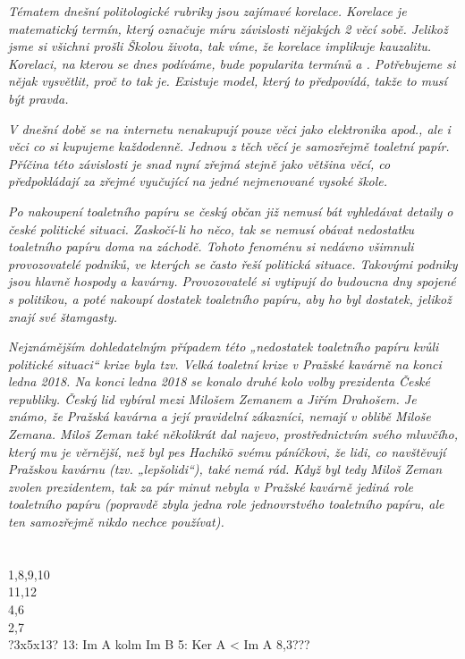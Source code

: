 \documentclass[12pt, a4paper]{article}
\begin{document}
\textit{Tématem dnešní politologické rubriky jsou zajímavé korelace. Korelace je matematický termín, který označuje míru závislosti nějakých 2 věcí sobě. Jelikož jsme si všichni prošli Školou života, tak víme, že korelace implikuje kauzalitu. Korelaci, na kterou se dnes podíváme, bude popularita termínů  a . Potřebujeme si nějak vysvětlit, proč to tak je. Existuje model, který to předpovídá, takže to musí být pravda. }

\textit{V dnešní době se na internetu nenakupují pouze věci jako elektronika apod., ale i věci co si kupujeme každodenně. Jednou z těch věcí je samozřejmě toaletní papír. Příčina této závislosti je snad nyní zřejmá stejně jako většina věcí, co předpokládají za zřejmé vyučující na jedné nejmenované vysoké škole.}

\textit{Po nakoupení toaletního papíru se český občan již nemusí bát vyhledávat detaily o české politické situaci. Zaskočí-li ho něco, tak se nemusí obávat nedostatku toaletního papíru doma na záchodě. Tohoto fenoménu si nedávno všimnuli provozovatelé podniků, ve kterých se často řeší politická situace. Takovými podniky jsou hlavně hospody a kavárny. Provozovatelé si vytipují do budoucna dny spojené s politikou, a poté nakoupí dostatek toaletního papíru, aby ho byl dostatek, jelikož znají své štamgasty.}

\textit{Nejznámějším dohledatelným případem této „nedostatek toaletního papíru kvůli politické situaci“ krize byla tzv. Velká toaletní krize v Pražské kavárně na konci ledna 2018. Na konci ledna 2018 se konalo druhé kolo volby prezidenta České republiky. Český lid vybíral mezi Milošem Zemanem a Jiřím Drahošem. Je známo, že Pražská kavárna a její pravidelní zákazníci, nemají v oblibě Miloše Zemana. Miloš Zeman také několikrát dal najevo, prostřednictvím svého mluvčího, který mu je věrnější, než byl pes Hachikō svému páníčkovi, že lidi, co navštěvují Pražskou kavárnu (tzv. „lepšolidi“), také nemá rád. Když byl tedy Miloš Zeman zvolen prezidentem, tak za pár minut nebyla v Pražské kavárně jediná role toaletního papíru (popravdě zbyla jedna role jednovrstvého toaletního papíru, ale ten samozřejmě nikdo nechce používat).}

\section{}
1,8,9,10\\
11,12\\
4,6\\
2,7\\
?3x5x13?
13: Im A kolm Im B
5: Ker A < Im A
8,3???
\end{document}
